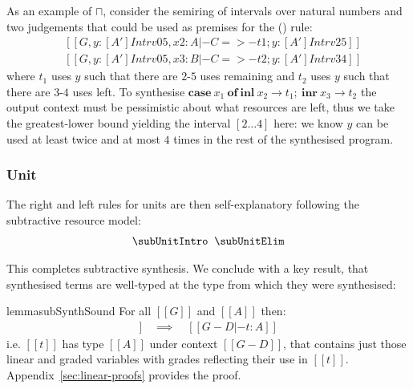 As an example of $\sqcap$, consider the semiring of intervals over natural numbers and two
judgements that could be used as premises for the (\subSumElimName) rule:
%
\begin{align*}
& [[ G, y : [A'] Intrv 0 5, x2 : A |- C =>- t1 ; y : [A'] Intrv 2 5 ]] \\
& [[ G, y : [A'] Intrv 0 5, x3 : B |- C =>- t2 ; y : [A'] Intrv 3 4 ]]
\end{align*}
%
where $t_1$ uses $y$ such that there are $2$-$5$ uses remaining
and $t_2$ uses $y$ such that there are $3$-$4$
uses left. To synthesise $\textbf{case} \ x_{1}\ \textbf{of}\ \textbf{inl}\ x_{2} \rightarrow t_{1};\ \textbf{inr}\ x_{3} \rightarrow t_{2}$
the output context must be pessimistic about what resources are left,
thus we take the greatest-lower bound yielding the interval $[
2\dots4 ]$ here: we know $y$ can be used at least twice and at most
$4$ times in the rest of the synthesised program.

\subsubsection{Unit}
The right and left rules for units are then
self-explanatory following the subtractive resource model:
%
\begin{align*}
\begin{array}{c}
  \subUnitIntro
  \;\;
  \subUnitElim
\end{array}
\end{align*}

%

This completes subtractive synthesis. We conclude
with a key result, that synthesised terms are well-typed at the type from which they
were synthesised:
%
\begin{restatable}{lemma}{subSynthSound}
\label{lemma:subSynthSound}
For all $[[ G ]]$ and $[[ A ]]$
then:
\begin{align*}
[[ G |- A =>- t ; D ]] \quad \implies \quad [[ G - D |- t : A ]]
\end{align*}
i.e. $[[ t ]]$ has type $[[ A ]]$
under context $[[ G - D ]]$,
that contains just those linear and
graded variables with grades reflecting their use in $[[ t ]]$.
Appendix~\ref{sec:linear-proofs} provides the proof.
\end{restatable}


